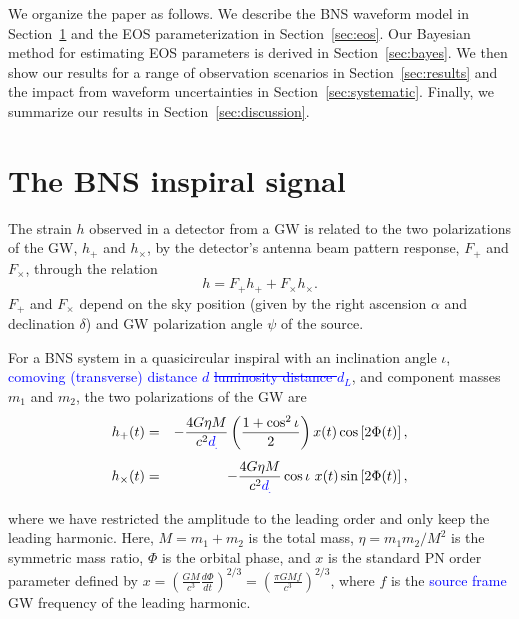 \documentclass[twocolumn,prd,amssymb,aps,nofootinbib,showpacs,epsf]{revtex4}
\newcommand\les[2]{\textcolor{blue}{{#1}\sout{#2}}}
\begin{document}
We organize the paper as follows. We describe the BNS waveform model in Section~\ref{sec:waveform} and the EOS parameterization in Section~\ref{sec:eos}. Our Bayesian method for estimating EOS parameters is derived in Section~\ref{sec:bayes}. We then show our results for a range of observation scenarios in Section~\ref{sec:results} and the impact from waveform uncertainties in Section~\ref{sec:systematic}. Finally, we summarize our results in Section~\ref{sec:discussion}.

\section{The BNS inspiral signal}
\label{sec:waveform}

The strain $h$ observed in a detector from a GW is related to the two polarizations of the GW, $h_+$ and $h_\times$, by the detector's antenna beam pattern response, $F_+$ and $F_\times$, through the relation
\begin{equation}
h = F_+ h_+ + F_\times h_\times.
\end{equation}
$F_+$ and $F_\times$ depend on the sky position (given by the right ascension $\alpha$ and declination $\delta$) and GW polarization angle $\psi$ of the source.

For a BNS system in a quasicircular inspiral with an inclination angle $\iota$, \les{comoving (transverse) distance $d$ }{luminosity distance $d_L$}, and component masses $m_1$ and $m_2$, the two polarizations of the GW are
\begin{eqnarray}
\label{eq:hoftp}
h_+(t)&=&-\frac{4G\eta M}{c^2 \les{d}{}}\left(\frac{1+\cos^2\iota}{2}\right)x(t)\cos\left[2\Phi(t)\right],\\
\label{eq:hoftc}
h_\times(t)&=&-\frac{4G\eta M}{c^2 \les{d}{}}\cos\iota\mbox{ }x(t)\sin\left[2\Phi(t)\right],
\end{eqnarray}
where we have restricted the amplitude to the leading order and only keep the leading harmonic. Here, $M=m_1+m_2$ is the total mass, $\eta=m_1 m_2/M^2$ is the symmetric mass ratio, $\Phi$ is the orbital phase, and $x$ is the standard PN order parameter defined by $x = \left( \frac{GM}{c^3}\frac{d\Phi}{dt} \right)^{2/3} = \left( \frac{\pi GM f}{c^3} \right)^{2/3}$, where $f$ is the \les{source frame}{} GW frequency of the leading harmonic.
\end{document}

